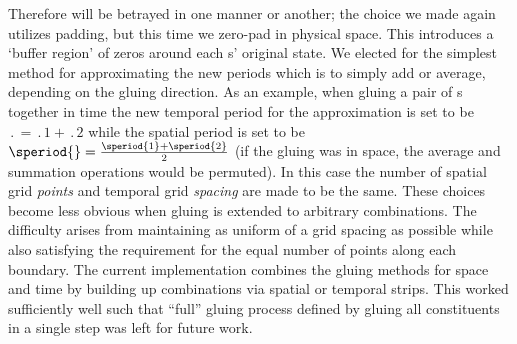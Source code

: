 \begin{description}
{{Therefore  will be
betrayed in one manner or another; the choice we made again utilizes padding, but this time
we zero-pad in physical space. This introduces a `buffer region' of zeros around each {\fpo}s'
original state. }
We elected for the simplest method for
approximating the new periods which is to simply add or average, depending on the gluing direction.
As an example, when gluing a pair of {\po}s together in time the new temporal period for the
approximation is set to be $\period{} = \period{1} + \period{2}$ while the spatial period is
set to be $\speriod{} = \frac{\speriod{1} + \speriod{2}}{2}$ (if the gluing was in space, the average and
summation operations would be permuted).
In this case the number of spatial grid \emph{points} %
and temporal grid \emph{spacing} are made to be the same.
These choices become less obvious when gluing is extended to
arbitrary {\spt} combinations. The difficulty arises from maintaining
as uniform of a grid spacing as possible while also
satisfying the requirement for the equal number of points along
each boundary. The current implementation combines the gluing
methods for space and time by building up {\spt} combinations via
spatial or temporal strips. This worked sufficiently well such that
``full'' gluing process defined by gluing all constituents in a single step was left for future work.

}

\end{description}
